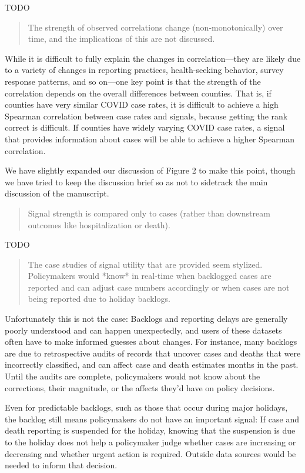\documentclass[11pt]{article}
\begin{document}
TODO

\begin{quote}
  The strength of observed correlations change (non-monotonically) over time,
  and the implications of this are not discussed.
\end{quote}

While it is difficult to fully explain the changes in correlation---they are
likely due to a variety of changes in reporting practices, health-seeking
behavior, survey response patterns, and so on---one key point is that the
strength of the correlation depends on the overall differences between counties.
That is, if counties have very similar COVID case rates, it is difficult to
achieve a high Spearman correlation between case rates and signals, because
getting the rank correct is difficult. If counties have widely varying COVID
case rates, a signal that provides information about cases will be able to
achieve a higher Spearman correlation.

We have slightly expanded our discussion of Figure 2 to make this point, though
we have tried to keep the discussion brief so as not to sidetrack the main
discussion of the manuscript.

\begin{quote}
  Signal strength is compared only to cases (rather than downstream outcomes
  like hospitalization or death).
\end{quote}

TODO

\begin{quote}
  The case studies of signal utility that are provided seem stylized.
  Policymakers would *know* in real-time when backlogged cases are reported and
  can adjust case numbers accordingly or when cases are not being reported due
  to holiday backlogs.
\end{quote}

Unfortunately this is not the case: Backlogs and reporting delays are generally
poorly understood and can happen unexpectedly, and users of these datasets often
have to make informed guesses about changes. For instance, many backlogs are due
to retrospective audits of records that uncover cases and deaths that were
incorrectly classified, and can affect case and death estimates months in the
past. Until the audits are complete, policymakers would not know about the
corrections, their magnitude, or the affects they'd have on policy decisions.

Even for predictable backlogs, such as those that occur during major holidays,
the backlog still means policymakers do not have an important signal: If case
and death reporting is suspended for the holiday, knowing that the suspension is
due to the holiday does not help a policymaker judge whether cases are
increasing or decreasing and whether urgent action is required. Outside data
sources would be needed to inform that decision.
\end{document}
